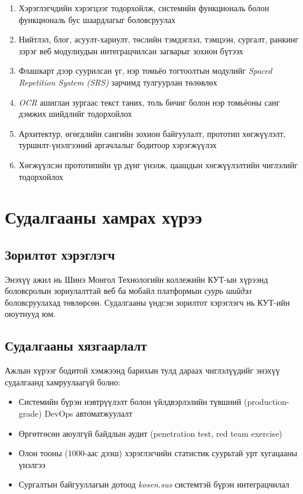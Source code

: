 \begin{enumerate}[label=\textbf{\arabic*.}, leftmargin=2em, itemsep=0.35em, topsep=0.35em]
    \item Хэрэглэгчдийн хэрэгцээг тодорхойлж, системийн функциональ болон функциональ бус шаардлагыг боловсруулах
    \item Нийтлэл, блог, асуулт-хариулт, төслийн тэмдэглэл, тэмцээн, сургалт, ранкинг зэрэг веб модулиудын интеграцчилсан загварыг зохион бүтээх
    \item Флашкарт дээр суурилсан үг, нэр томьёо тогтоолтын модулийг \emph{Spaced Repetition System (SRS)} зарчимд тулгуурлан төлөвлөх
    \item \emph{OCR} ашиглан зургаас текст таних, толь бичиг болон нэр томьёоны санг дэмжих шийдлийг тодорхойлох
    \item Архитектур, өгөгдлийн сангийн зохион байгуулалт, прототип хөгжүүлэлт, туршилт-үнэлгээний аргачлалыг бодитоор хэрэгжүүлэх
    \item Хөгжүүлсэн прототипийн үр дүнг үнэлж, цаашдын хөгжүүлэлтийн чиглэлийг тодорхойлох
\end{enumerate}

\section{Судалгааны хамрах хүрээ}

\subsection{Зорилтот хэрэглэгч}

Энэхүү ажил нь Шинэ Монгол Технологийн коллежийн КУТ-ын хүрээнд боловсролын зориулалттай веб ба мобайл платформын \textit{суурь шийдэл} боловсруулахад төвлөрсөн. Судалгааны үндсэн зорилтот хэрэглэгч нь КУТ-ийн оюутнууд юм.

\subsection{Судалгааны хязгаарлалт}

Ажлын хүрээг бодитой хэмжээнд барихын тулд дараах чиглэлүүдийг энэхүү судалгаанд хамруулаагүй болно:

\begin{itemize}[leftmargin=2em, itemsep=0.25em]
    \item Системийн бүрэн нэвтрүүлэлт болон үйлдвэрлэлийн түвшний (production-grade) DevOps автоматжуулалт
    \item Өргөтгөсөн аюулгүй байдлын аудит (penetration test, red team exercise)
    \item Олон тооны (1000-аас дээш) хэрэглэгчийн статистик суурьтай урт хугацааны үнэлгээ
    \item Сургалтын байгууллагын дотоод \textit{kosen.sus} системтэй бүрэн интеграцчилал
\end{itemize}


